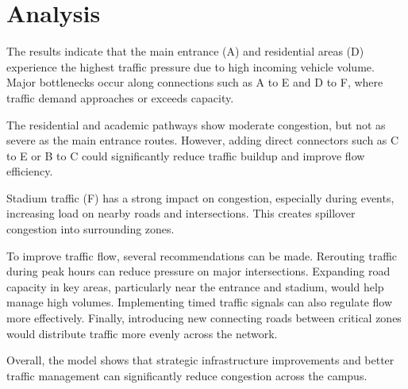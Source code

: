 \documentclass{ximera}
\begin{document}
\section*{Analysis}

The results indicate that the main entrance (A) and residential areas (D) experience the highest traffic pressure due to high incoming vehicle volume. Major bottlenecks occur along connections such as A to E and D to F, where traffic demand approaches or exceeds capacity.

The residential and academic pathways show moderate congestion, but not as severe as the main entrance routes. However, adding direct connectors such as C to E or B to C could significantly reduce traffic buildup and improve flow efficiency.

Stadium traffic (F) has a strong impact on congestion, especially during events, increasing load on nearby roads and intersections. This creates spillover congestion into surrounding zones.

To improve traffic flow, several recommendations can be made. Rerouting traffic during peak hours can reduce pressure on major intersections. Expanding road capacity in key areas, particularly near the entrance and stadium, would help manage high volumes. Implementing timed traffic signals can also regulate flow more effectively. Finally, introducing new connecting roads between critical zones would distribute traffic more evenly across the network.

Overall, the model shows that strategic infrastructure improvements and better traffic management can significantly reduce congestion across the campus.
\end{document}
